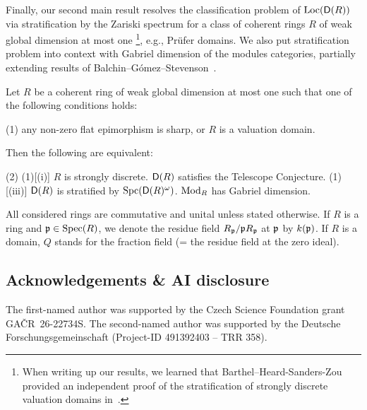 \documentclass[reqno,a4paper]{amsart}
\begin{document}
Finally, our second main result resolves the classification problem of $\operatorname{Loc}(\mathsf{D}(R))$ via stratification by the Zariski spectrum for a class of coherent rings $R$ of weak global dimension at most one%
\footnote{When writing up our results, we learned that Barthel--Heard-Sanders-Zou provided an independent proof of the stratification of strongly discrete valuation domains in~\cite{BHSZ}.}, e.g., Prüfer domains.
We also put stratification problem into context with Gabriel dimension of the modules categories, partially extending results of Balchin--Gómez--Stevenson~\cite{isolated}.

\begin{theorem*}[{\Cref{thm:kg=stratforvd}, \Cref{cor:kgandwgld}}]
    Let $R$ be a coherent ring of weak global dimension at most one such that one of the following conditions holds:
    \begin{tasks}[style=enumerate, label-align=right ,column-sep = {-7mm},item-indent = {7mm},label-offset = {0.8em} ](1)
        \task*[(a)] any non-zero flat epimorphism is sharp, or
        \task*[(b)] $R$ is a valuation domain.
    \end{tasks}
    Then the following are equivalent:
\begin{tasks}[style=enumerate, label-align=right ,column-sep = {-7mm},item-indent = {7mm},label-offset = {0.8em} ](2)
        \task*(1)[(i)] $R$ is strongly discrete.
        \task*[(ii)] $\mathsf{D}(R)$ satisfies the Telescope Conjecture.
        \task*(1)[(iii)] $\mathsf{D}(R)$ is stratified by $\operatorname{Spc}(\mathsf{D}(R)^\omega)$.
        \task*[(iv)] $\operatorname{Mod}_R$ has Gabriel dimension.
    \end{tasks}
\end{theorem*}




All considered rings are commutative and unital unless stated otherwise. If $R$ is a ring and $\mathfrak{p}\in\operatorname{Spec}(R)$, we denote the residue field $R_{\mathfrak{p}}/\mathfrak{p} R_{\mathfrak{p}}$ at $\mathfrak{p}$ by $k(\mathfrak{p})$. If $R$ is a domain, $Q$ stands for the fraction field (= the residue field at the zero ideal).




 \subsection*{Acknowledgements \& AI disclosure} 
The first-named author was supported by the Czech Science Foundation grant GA\v{C}R~26-22734S.
The second-named author was supported by the Deutsche Forschungsgemeinschaft (Project-ID 491392403 -- TRR 358).
\end{document}
